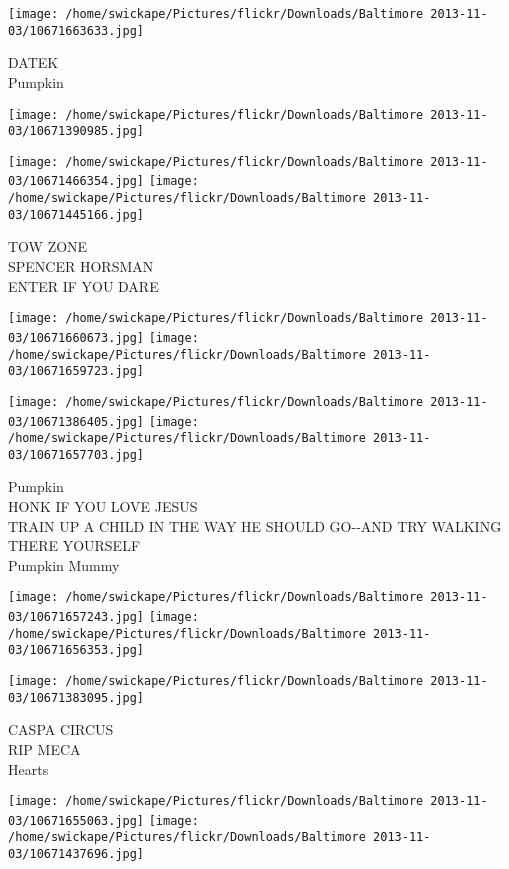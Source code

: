 \documentclass[10pt,letterpaper]{article}
\begin{document}
\vspace{0.25in}
\texttt{[image: /home/swickape/Pictures/flickr/Downloads/Baltimore 2013-11-03/10671663633.jpg]}

DATEK\\
Pumpkin
\pagebreak

\texttt{[image: /home/swickape/Pictures/flickr/Downloads/Baltimore 2013-11-03/10671390985.jpg]}

\vspace{0.25in}
\texttt{[image: /home/swickape/Pictures/flickr/Downloads/Baltimore 2013-11-03/10671466354.jpg]}
\texttt{[image: /home/swickape/Pictures/flickr/Downloads/Baltimore 2013-11-03/10671445166.jpg]}

TOW ZONE\\
SPENCER HORSMAN\\
ENTER IF YOU DARE
\pagebreak

\texttt{[image: /home/swickape/Pictures/flickr/Downloads/Baltimore 2013-11-03/10671660673.jpg]}
\texttt{[image: /home/swickape/Pictures/flickr/Downloads/Baltimore 2013-11-03/10671659723.jpg]}

\texttt{[image: /home/swickape/Pictures/flickr/Downloads/Baltimore 2013-11-03/10671386405.jpg]}
\texttt{[image: /home/swickape/Pictures/flickr/Downloads/Baltimore 2013-11-03/10671657703.jpg]}

Pumpkin\\
HONK IF YOU LOVE JESUS\\
TRAIN UP A CHILD IN THE WAY HE SHOULD GO{-}{-}AND TRY WALKING THERE YOURSELF\\
Pumpkin Mummy
\pagebreak

\texttt{[image: /home/swickape/Pictures/flickr/Downloads/Baltimore 2013-11-03/10671657243.jpg]}
\texttt{[image: /home/swickape/Pictures/flickr/Downloads/Baltimore 2013-11-03/10671656353.jpg]}

\vspace{0.25in}
\texttt{[image: /home/swickape/Pictures/flickr/Downloads/Baltimore 2013-11-03/10671383095.jpg]}

CASPA CIRCUS\\
RIP MECA\\
Hearts
\pagebreak

\texttt{[image: /home/swickape/Pictures/flickr/Downloads/Baltimore 2013-11-03/10671655063.jpg]}
\texttt{[image: /home/swickape/Pictures/flickr/Downloads/Baltimore 2013-11-03/10671437696.jpg]}
\end{document}
